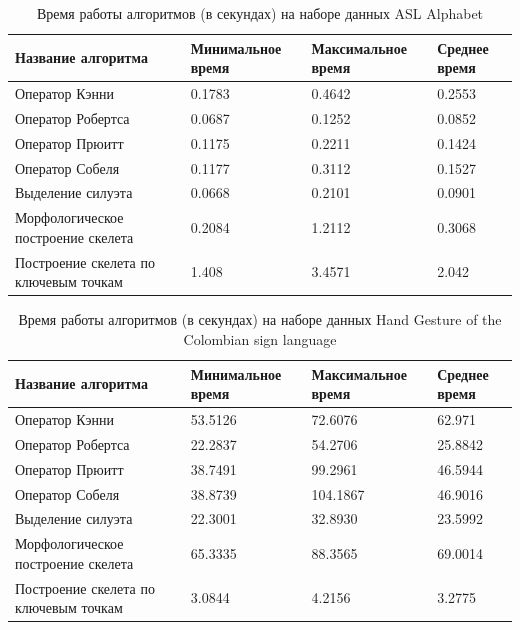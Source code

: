 \begin{table}[h]
	\caption{\label{tab:asl-alphaber}Время работы алгоритмов (в секундах) на наборе данных ASL Alphabet}
	\begin{center}
		\begin{tabular}{|p{}|p{}|p{}|p{}|}
			\hline
			Название алгоритма & Минимальное время & Максимальное время & Среднее время \\
			\hline
			Оператор Кэнни & 0.1783 & 0.4642 & 0.2553 \\
			Оператор Робертса & 0.0687 & 0.1252 & 0.0852 \\
			Оператор Прюитт & 0.1175 & 0.2211 & 0.1424  \\
			Оператор Собеля & 0.1177 & 0.3112 & 0.1527 \\
			Выделение силуэта & 0.0668 & 0.2101 & 0.0901 \\
			Морфологическое построение скелета & 0.2084 & 1.2112 & 0.3068 \\
			Построение скелета по ключевым точкам & 1.408 & 3.4571 & 2.042 \\
			\hline
		\end{tabular}
	\end{center}
\end{table}

\begin{table}[h]
	\caption{\label{tab:colombian-alphaber}Время работы алгоритмов (в секундах) на наборе данных Hand Gesture of the Colombian sign language}
	\begin{center}
		\begin{tabular}{|p{}|p{}|p{}|p{}|}
			\hline
			Название алгоритма & Минимальное время & Максимальное время & Среднее время \\
			\hline
			Оператор Кэнни & 53.5126 & 72.6076 & 62.971 \\
			Оператор Робертса & 22.2837 & 54.2706 & 25.8842 \\
			Оператор Прюитт & 38.7491 & 99.2961 & 46.5944 \\
			Оператор Собеля & 38.8739 & 104.1867 & 46.9016 \\
			Выделение силуэта & 22.3001 & 32.8930 & 23.5992 \\
			Морфологическое построение скелета & 65.3335 & 88.3565 & 69.0014 \\
			Построение скелета  по ключевым точкам & 3.0844 & 4.2156 & 3.2775 \\
			\hline
		\end{tabular}
	\end{center}
\end{table} 

